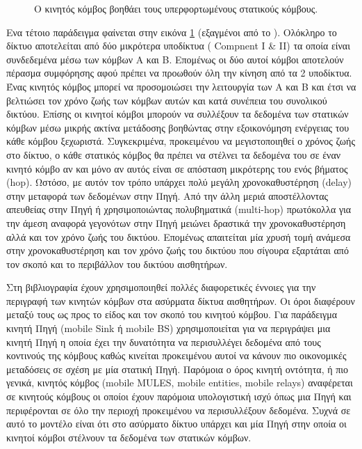 \begin{itemize}
\begin{figure}[h]
	\caption{O κινητός κόμβος βοηθάει τους υπερφορτωμένους στατικούς κόμβους.}
	\label{fig:mobile_help}
\end{figure}
Ενα τέτοιο παράδειγμα φαίνεται στην εικόνα \ref{fig:mobile_help} (εξαγμένοι από το \cite{using_mobile_elements_to_prolong_lefetime}). Ολόκληρο το δίκτυο αποτελείται
από δύο μικρότερα υποδίκτυα ( Compnent I \& II) τα οποία είναι συνδεδεμένα μέσω των κόμβων Α και Β. Επομένως οι δύο αυτοί κόμβοι αποτελούν πέρασμα συμφόρησης αφού
πρέπει να προωθούν όλη την κίνηση από τα 2 υποδίκτυα. Ένας κινητός κόμβος μπορεί να προσομοιώσει την λειτουργία των Α και Β και έτσι να βελτιώσει τον χρόνο ζωής των
κόμβων αυτών και κατά συνέπεια του συνολικού δικτύου. Επίσης οι κινητοί κόμβοι μπορούν να συλλέξουν τα δεδομένα των στατικών κόμβων μέσω μικρής ακτίνα μετάδοσης
βοηθώντας στην εξοικονόμηση ενέργειας του κάθε κόμβου ξεχωριστά. Συγκεκριμένα, προκειμένου να μεγιστοποιηθεί ο χρόνος ζωής στο δίκτυο, ο κάθε στατικός κόμβος θα
πρέπει να στέλνει τα δεδομένα του σε έναν κινητό κόμβο αν και μόνο αν αυτός είναι σε απόσταση μικρότερης του ενός βήματος (hop). Ωστόσο, με αυτόν τον τρόπο υπάρχει
πολύ μεγάλη χρονοκαθυστέρηση (delay) στην μεταφορά των δεδομένων στην Πηγή. Από την άλλη μεριά αποστέλλοντας απευθείας στην Πηγή ή χρησιμοποιώντας πολυβηματικά
(multi-hop) πρωτόκολλα για την άμεση αναφορά γεγονότων στην Πηγή μειώνει δραστικά την χρονοκαθυστέρηση αλλά και τον χρόνο ζωής του δικτύου. Επομένως απαιτείται μία
χρυσή τομή ανάμεσα στην χρονοκαθυστέρηση και τον χρόνο ζωής του δικτύου που σίγουρα εξαρτάται από τον σκοπό και το περιβάλλον του δικτύου αισθητήρων.
\end{itemize}

Στη βιβλιογραφία έχουν χρησιμοποιηθεί πολλές διαφορετικές έννοιες για την περιγραφή των κινητών κόμβων στα ασύρματα δίκτυα αισθητήρων. Οι όροι διαφέρουν μεταξύ τους
ως προς το είδος και τον σκοπό του κινητού κόμβου. Για παράδειγμα κινητή Πηγή (mobile Sink ή mobile BS) χρησιμοποιείται για να περιγράψει μια κινητή Πηγή η οποία
έχει την δυνατότητα να περισυλλέγει δεδομένα από τους κοντινούς της κόμβους καθώς κινείται προκειμένου αυτοί να κάνουν πιο οικονομικές μεταδόσεις σε σχέση με μία
στατική Πηγή. Παρόμοια ο όρος κινητή οντότητα, ή πιο γενικά, κινητός κόμβος (mobile MULES, mobile entities, mobile relays) αναφέρεται σε κινητούς κόμβους οι οποίοι
έχουν παρόμοια υπολογιστική ισχύ όπως μια Πηγή και περιφέρονται σε όλο την περιοχή προκειμένου να περισυλλέξουν δεδομένα. Συχνά σε αυτό το μοντέλο είναι ότι
στο ασύρματο δίκτυο υπάρχει και μία Πηγή στην οποία οι κινητοί κόμβοι στέλνουν τα δεδομένα των στατικών κόμβων.

